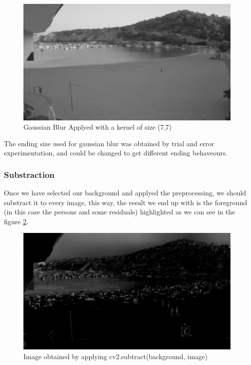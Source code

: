 \documentclass[10pt]{article}
\begin{document}
\begin{figure}[h]
    \centering
    \includegraphics[width=\textwidth]{img/back_blur.png}
    \caption{Gaussian Blur Applyed with a kernel of size (7,7)}
    \label{fig:gaussian}
\end{figure}

The ending size used for gaussian blur was obtained by trial and error experimentation, and could be changed to get different ending behaveours.


\subsubsection*{Substraction}

Once we have selected our background and applyed the preprocessing, we should substract it to every image, this way, the result we end up with is the foreground (in this case the persons and some residuals) highlighted as we can see in the figure \ref{fig:sub}. 

\begin{figure}
    \centering
    \includegraphics[width=\textwidth]{img/sub.jpg}
    \caption{Image obtained by applying cv2.subtract(background, image)}
    \label{fig:sub}
\end{figure}
\end{document}
